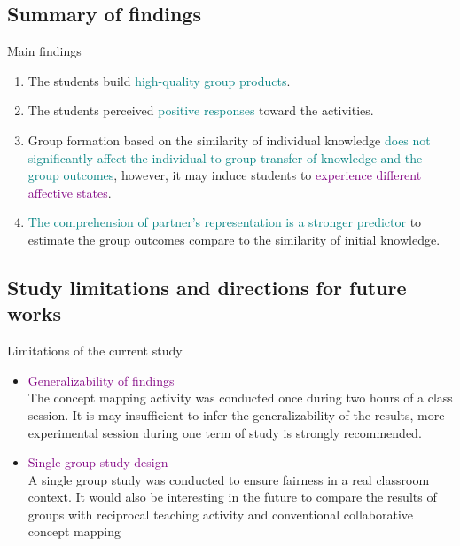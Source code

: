 \subsection{Summary of findings}
\begin{frame}{Main findings}
    \begin{enumerate}
    \item <1-> The students build \textcolor{teal}{high-quality group products}. 
    \item <2-> The students perceived \textcolor{teal}{positive responses} toward the activities. 
    \item <3-> Group formation based on the similarity of individual 
    knowledge \textcolor{teal}{does not significantly affect the individual-to-group 
    transfer of knowledge and the group outcomes}, however, 
    it may induce students to \textcolor{purple}{experience different affective states}.
    \item <4-> \textcolor{teal}{The comprehension of partner's representation is a 
    stronger predictor} to estimate the group outcomes compare to the similarity of initial knowledge. 
\end{enumerate}  
\end{frame}

\subsection{Study limitations and directions for future works}
\begin{frame}{Limitations of the current study}
    \begin{itemize}
        \item <1>\textcolor{purple}{Generalizability of findings}\\
        {\small The concept mapping activity was conducted once during two hours 
        of a class session. It is may insufficient to infer the generalizability of
        the results, more experimental session during one term of 
        study is strongly recommended.}
        \item <2>\textcolor{purple}{Single group study design}\\
        {\small A single group study was conducted to ensure fairness in a real classroom context. It would also be interesting in the future to compare the results of groups with reciprocal teaching activity and conventional collaborative concept mapping}
    \end{itemize}
\end{frame}

